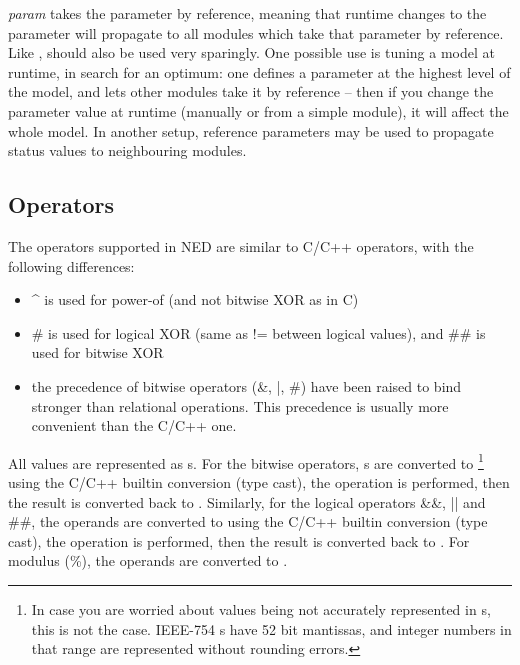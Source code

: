  \textit{param} takes the parameter by reference, meaning that
runtime changes to the parameter will propagate to all modules which
take that parameter by reference. Like , 
should also be used very sparingly. One possible use is tuning a model
at runtime, in search for an optimum: one defines a parameter
at the highest level of the model, and lets other modules take it by reference --
then if you change the parameter value at runtime
(manually or from a simple module), it will affect the whole model.
In another setup, reference parameters may be used to propagate
status values to neighbouring modules.



\subsection{Operators}

The operators supported in NED are similar to C/C++ operators,
with the following differences:

\begin{itemize}
  \item{{\textasciicircum} is used for power-of (and not bitwise XOR as in C)}
  \item{\# is used for logical XOR (same as != between logical values), and
        \#\# is used for bitwise XOR}
  \item{the precedence of bitwise operators (\&, |, \#) have been raised
        to bind stronger than relational operations. This precedence is usually
        more convenient than the C/C++ one.}
\end{itemize}

All values are represented as s. For the bitwise operators,
s are converted to 
  \footnote{In case you are worried about  values being not accurately
  represented in s, this is not the case. IEEE-754 s
  have 52 bit mantissas, and integer numbers in that range are represented
  without rounding errors.}
using the C/C++ builtin conversion (type cast), the operation is performed,
then the result is converted back to .
Similarly, for the logical operators \&\&, || and \#\#,
the operands are converted to  using the C/C++ builtin
conversion (type cast), the operation is performed, then the result
is converted back to . For modulus (\%), the operands are
converted to .

